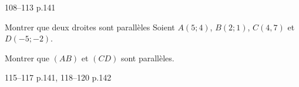 \documentclass[a4paper]{article}
\begin{document}
\begin{exercices}{}{}
  108--113 p.141
\end{exercices}

\begin{methode*}{Montrer que deux droites sont parallèles}{}
   Soient $A(5;4)$, $B(2;1)$, $C(4,7)$ et $D(-5;-2)$.
   
   Montrer que $(AB)$ et $(CD)$ sont parallèles.


   \vspace{5cm}
 
   \hfill{}
 \end{methode*}

\begin{exercices}{}{}
  115--117 p.141, 118--120 p.142
\end{exercices}


  
\end{document}
